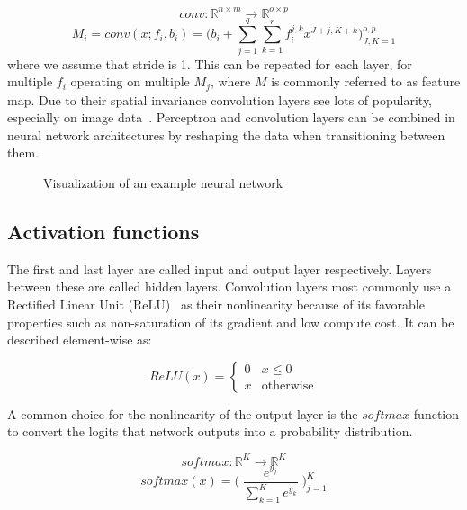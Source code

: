 \documentclass{article}
\begin{document}
\begin{equation}
    conv: \mathbb{R}^{n \times m} \xrightarrow{} \mathbb{R}^{o \times p}
\end{equation}
\begin{equation*}
    M_i = conv(x; f_i, b_i) = \Big(b_i + \sum_{j=1}^{q} \sum_{k=1}^{r} f_i^{j,k} x^{J+j, K+k}\Big)_{J,K=1}^{o, p}
\end{equation*}
where we assume that stride is 1.
\noindent This can be repeated for each layer, for multiple $f_i$ operating on multiple $M_j$, where $M$ is commonly
referred to as feature map.
Due to their spatial invariance convolution layers see lots of popularity, especially on image data~\cite{DBLP:journals/corr/abs-2002-02959}.
Perceptron and convolution layers can be combined in neural network architectures by reshaping the data when transitioning between them.

\begin{figure}[h]
  \centering
  
  \caption{Visualization of an example neural network}
\end{figure}

\subsection{Activation functions}

\noindent The first and last layer are called input and output layer respectively.
Layers between these are called hidden layers.
Convolution layers most commonly use a Rectified Linear Unit (ReLU)~\cite{DBLP:journals/corr/abs-1803-08375} as their nonlinearity 
because of its favorable properties such as non-saturation of its gradient and low compute cost.\newline
It can be described element-wise as:

\begin{equation}
    ReLU(x)=
        \begin{cases}
            0 &x\leq 0 \\
            x&\text{otherwise}
        \end{cases}
\end{equation}

\noindent A common choice for the nonlinearity of the output layer is the $softmax$ function to convert the 
logits that network outputs into a probability distribution. 

\begin{equation}
    softmax: \mathbb{R}^K \xrightarrow{} \mathbb{R}^K
\end{equation}
\begin{equation*}
    softmax(x) = \Big(\;\frac{e^{y_j}}{\sum_{k=1}^K e^{y_k}}\;\Big)_{j=1}^K
\end{equation*}
\end{document}
